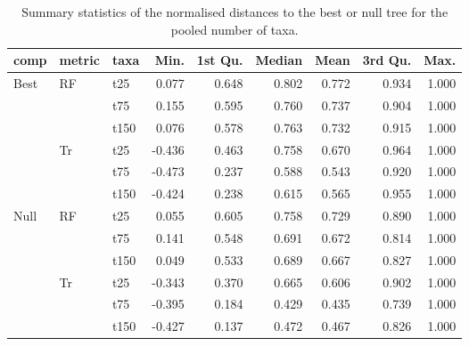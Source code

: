 \begin{table}[ht]
\centering
\begin{tabular}{lllrrrrrr}
  \hline
comp & metric & taxa & Min. & 1st Qu. & Median & Mean & 3rd Qu. & Max. \\ 
  \hline
Best & RF & t25 & 0.077 & 0.648 & 0.802 & 0.772 & 0.934 & 1.000 \\ 
   &  & t75 & 0.155 & 0.595 & 0.760 & 0.737 & 0.904 & 1.000 \\ 
   &  & t150 & 0.076 & 0.578 & 0.763 & 0.732 & 0.915 & 1.000 \\ 
   & Tr & t25 & -0.436 & 0.463 & 0.758 & 0.670 & 0.964 & 1.000 \\ 
   &  & t75 & -0.473 & 0.237 & 0.588 & 0.543 & 0.920 & 1.000 \\ 
   &  & t150 & -0.424 & 0.238 & 0.615 & 0.565 & 0.955 & 1.000 \\ 
  Null & RF & t25 & 0.055 & 0.605 & 0.758 & 0.729 & 0.890 & 1.000 \\ 
   &  & t75 & 0.141 & 0.548 & 0.691 & 0.672 & 0.814 & 1.000 \\ 
   &  & t150 & 0.049 & 0.533 & 0.689 & 0.667 & 0.827 & 1.000 \\ 
   & Tr & t25 & -0.343 & 0.370 & 0.665 & 0.606 & 0.902 & 1.000 \\ 
   &  & t75 & -0.395 & 0.184 & 0.429 & 0.435 & 0.739 & 1.000 \\ 
   &  & t150 & -0.427 & 0.137 & 0.472 & 0.467 & 0.826 & 1.000 \\ 
   \hline
\end{tabular}
\caption{Summary statistics of the normalised distances to the best or null tree for the pooled number of taxa.} 
\label{Full_Tab_pooledtaxa}
\end{table}
